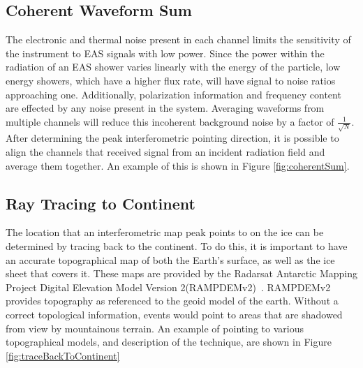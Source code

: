 		
	\subsection{Coherent Waveform Sum}
		The electronic and thermal noise present in each channel limits the sensitivity of the instrument to EAS signals with low power.  Since the power within the radiation of an EAS shower varies linearly with the energy of the particle, low energy showers, which have a higher flux rate, will have signal to noise ratios approaching one.  Additionally, polarization information and frequency content are effected by any noise present in the system.  Averaging waveforms from multiple channels will reduce this incoherent background noise by a factor of $\frac{1}{\sqrt{N}}$.  After determining the peak interferometric pointing direction, it is possible to align the channels that received signal from an incident radiation field and average them together.  An example of this is shown in Figure \ref{fig:coherentSum}.
	
	
	\subsection{Ray Tracing to Continent}
		 The location that an interferometric map peak points to on the ice can be determined by tracing back to the continent.  To do this, it is important to have an accurate topographical map of both the Earth's surface, as well as the ice sheet that covers it.  These maps are provided by the Radarsat Antarctic Mapping Project Digital Elevation Model Version 2(RAMPDEMv2)~\cite{RAMPDEM}.  RAMPDEMv2 provides topography as referenced to the geoid model of the earth.  Without a correct topological information, events would point to areas that are shadowed from view by mountainous terrain.  An example of pointing to various topographical models, and description of the technique, are shown in Figure \ref{fig:traceBackToContinent}
		 
